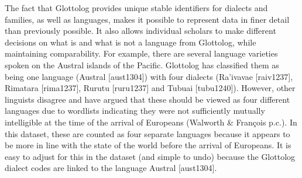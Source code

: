 \documentclass[a4paper,10pt]{article} %
\begin{document}
The fact that Glottolog provides unique stable identifiers for dialects and families, as well as languages, makes it possible to represent data in finer detail than previously possible. It also allows individual scholars to make different decisions on what is and what is not a language from Glottolog, while maintaining comparability. For example, there are several language varieties spoken on the Austral islands of the Pacific. Glottolog has classified them as being one language (Austral [aust1304]) with four dialects (Ra'ivavae [raiv1237], Rimatara [rima1237], Rurutu [ruru1237] and Tubuai [tubu1240]). However, other linguists disagree and have argued that these should be viewed as four different languages due to wordlists indicating they were not sufficiently mutually intelligible at the time of the arrival of Europeans (Walworth \& François p.c.). In this dataset, these are counted as four separate languages because it appears to be more in line with the state of the world before the arrival of Europeans. It is easy to adjust for this in the dataset (and simple to undo) because the Glottolog dialect codes are linked to the language Austral [aust1304]. 

\end{document}
